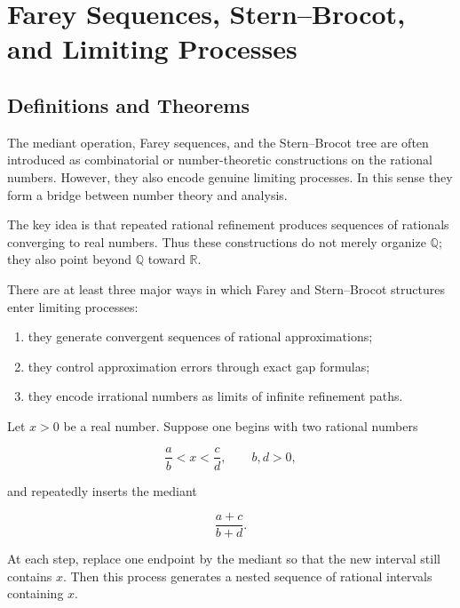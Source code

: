 
\section{Farey Sequences, Stern--Brocot, and Limiting Processes}

\subsection{Definitions and Theorems}

The mediant operation, Farey sequences, and the Stern--Brocot tree are
often introduced as combinatorial or number-theoretic constructions on
the rational numbers.  However, they also encode genuine limiting
processes.  In this sense they form a bridge between number theory and
analysis.

The key idea is that repeated rational refinement produces sequences of
rationals converging to real numbers.  Thus these constructions do not
merely organize $\mathbb{Q}$; they also point beyond $\mathbb{Q}$ toward
$\mathbb{R}$.

\begin{remark}
There are at least three major ways in which Farey and Stern--Brocot
structures enter limiting processes:

\begin{enumerate}
\item they generate convergent sequences of rational approximations;
\item they control approximation errors through exact gap formulas;
\item they encode irrational numbers as limits of infinite refinement
paths.
\end{enumerate}

\end{remark}


\begin{theorem}
\label{thm:stern-brocot-refinement}

Let $x>0$ be a real number.  Suppose one begins with two rational
numbers

\[
\frac{a}{b} < x < \frac{c}{d},
\qquad b,d>0,
\]

and repeatedly inserts the mediant

\[
\frac{a+c}{b+d}.
\]

At each step, replace one endpoint by the mediant so that the new
interval still contains $x$.  Then this process generates a nested
sequence of rational intervals containing $x$.

\end{theorem}

